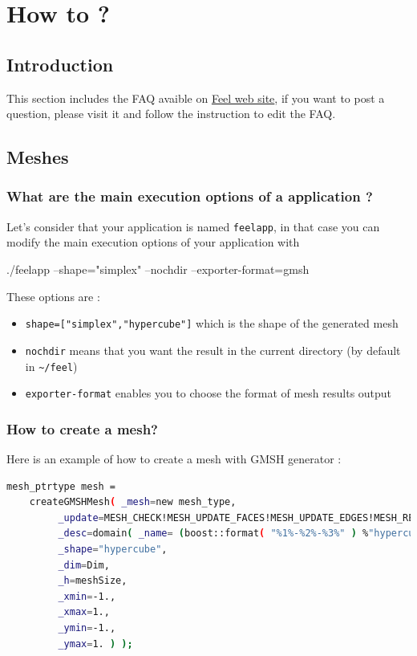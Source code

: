 \chapter{How to ?}
\label{sec:faq}

\section{Introduction}
\label{faq:intro}

This section includes the FAQ avaible on \href{https://trac.feelpp.org/wiki/FAQ}{Feel web site}, if you want to post a question, please visit it and follow the instruction to edit the FAQ.

\section{Meshes}
\label{faq:meshes}

\subsection{What are the main execution options of a \feel application ?}
Let's consider that your application is named \lstinline!feelapp!, in that case you can modify the main execution options of your application with 
\begin{unixcom}
		./feelapp --shape="simplex" --nochdir --exporter-format=gmsh
\end{unixcom}
These options are :
\begin{itemize}
\item \lstinline!shape=["simplex","hypercube"]! which is the shape of the generated mesh
\item \lstinline!nochdir! means that you want the result in the current directory (by default in \lstinline!~/feel!)
\item \lstinline!exporter-format! enables you to choose the format of mesh results output
\end{itemize}

\subsection{How to create a mesh?}
Here is an example of how to create a mesh with GMSH generator :

\begin{lstlisting}[language=sh]
 mesh_ptrtype mesh = 
	createGMSHMesh( _mesh=new mesh_type,
         _update=MESH_CHECK!MESH_UPDATE_FACES!MESH_UPDATE_EDGES!MESH_RENUMBER,
         _desc=domain( _name= (boost::format( "%1%-%2%-%3%" ) %"hypercube" %Dim %1).str(),
         _shape="hypercube",
         _dim=Dim,
         _h=meshSize,
         _xmin=-1.,
         _xmax=1.,
         _ymin=-1.,
         _ymax=1. ) );
\end{lstlisting}

